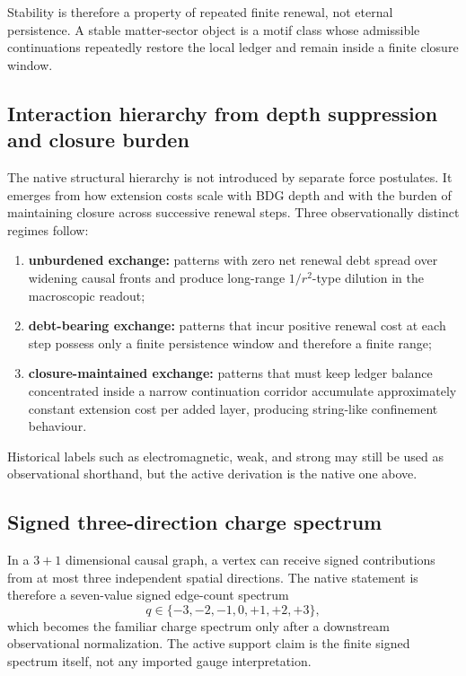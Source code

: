\documentclass[11pt]{article}
\begin{document}
Stability is therefore a property of repeated finite renewal, not eternal persistence. A stable matter-sector object is a motif class whose admissible continuations repeatedly restore the local ledger and remain inside a finite closure window.

\subsection{Interaction hierarchy from depth suppression and closure burden}

The native structural hierarchy is not introduced by separate force postulates. It emerges from how extension costs scale with BDG depth and with the burden of maintaining closure across successive renewal steps. Three observationally distinct regimes follow:
\begin{enumerate}[nosep]
    \item \textbf{unburdened exchange:} patterns with zero net renewal debt spread over widening causal fronts and produce long-range $1/r^2$-type dilution in the macroscopic readout;
    \item \textbf{debt-bearing exchange:} patterns that incur positive renewal cost at each step possess only a finite persistence window and therefore a finite range;
    \item \textbf{closure-maintained exchange:} patterns that must keep ledger balance concentrated inside a narrow continuation corridor accumulate approximately constant extension cost per added layer, producing string-like confinement behaviour.
\end{enumerate}

Historical labels such as electromagnetic, weak, and strong may still be used as observational shorthand, but the active derivation is the native one above.

\subsection{Signed three-direction charge spectrum}

In a $3+1$ dimensional causal graph, a vertex can receive signed contributions from at most three independent spatial directions. The native statement is therefore a seven-value signed edge-count spectrum
\begin{equation}
q \in \{-3,-2,-1,0,+1,+2,+3\},
\end{equation}
which becomes the familiar charge spectrum only after a downstream observational normalization. The active support claim is the finite signed spectrum itself, not any imported gauge interpretation.
\end{document}
